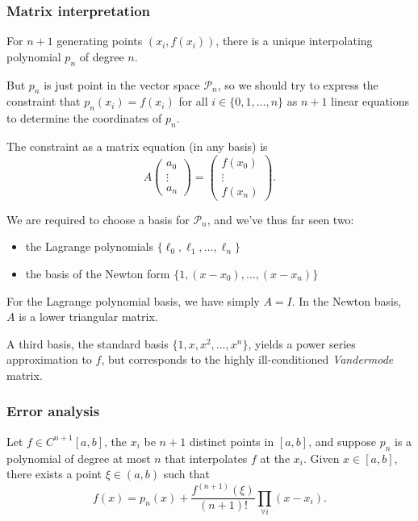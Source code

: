 \documentclass{article}
\providecommand{\tightlist}{%
      \setlength{\itemsep}{0pt}\setlength{\parskip}{0pt}}
\begin{document}
\hypertarget{matrix-interpretation}{%
\subsubsection{Matrix interpretation}\label{matrix-interpretation}}

For \(n+1\) generating points \((x_i,f(x_i))\), there is a unique
interpolating polynomial \(p_n\) of degree \(n\).

But \(p_n\) is just point in the vector space \(\mathcal{P}_n\), so we
should try to express the constraint that \(p_n(x_i) = f(x_i)\) for all
\(i \in \{0,1,\ldots,n\}\) as \(n+1\) linear equations to determine the
coordinates of \(p_n\).

The constraint as a matrix equation (in any basis) is
\[A \begin{pmatrix}a_0\\ \vdots\\ a_n\end{pmatrix} = \begin{pmatrix}f(x_0)\\ \vdots\\ f(x_n)\end{pmatrix}.\]

We are required to choose a basis for \(\mathcal{P}_n\), and we've thus
far seen two:

\begin{itemize}
\tightlist
\item
  the Lagrange polynomials \(\{\ell_0, \ell_1, \ldots, \ell_n\}\)
\item
  the basis of the Newton form \(\{1, (x-x_0), \ldots, (x-x_n)\}\)
\end{itemize}

For the Lagrange polynomial basis, we have simply \(A = I\). In the
Newton basis, \(A\) is a lower triangular matrix.

A third basis, the standard basis \(\{1,x,x^2,\ldots, x^n\}\), yields a
power series approximation to \(f\), but corresponds to the highly
ill-conditioned \emph{Vandermode} matrix.

\hypertarget{error-analysis}{%
\subsubsection{Error analysis}\label{error-analysis}}

Let \(f \in C^{n+1}[a,b]\), the \(x_i\) be \(n+1\) distinct points in
\([a,b]\), and suppose \(p_n\) is a polynomial of degree at most \(n\)
that interpolates \(f\) at the \(x_i\). Given \(x \in [a,b]\), there
exists a point \(\xi \in (a,b)\) such that
\[f(x) = p_n(x) + \frac{f^{(n+1)}(\xi)}{(n+1)!}\prod_{\forall i}(x-x_i).\]
\end{document}
